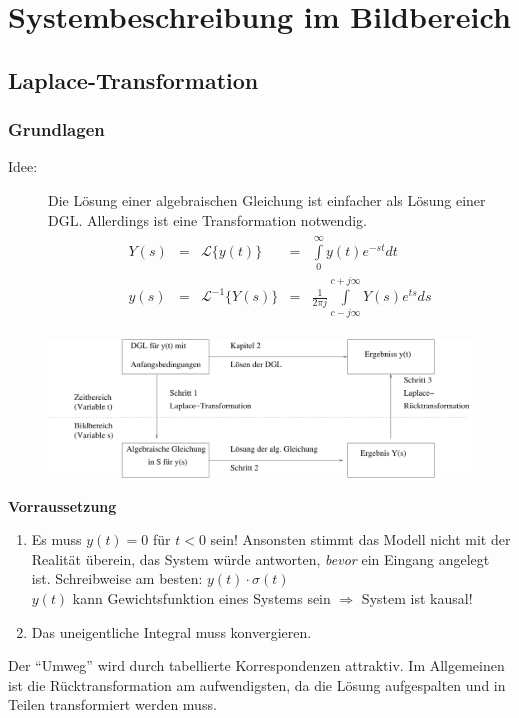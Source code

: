 \message{ !name(Mitschrieb_SysRegel.tex)}\documentclass[12pt,a4paper,ngerman]{scrartcl}
\begin{document}
\section{Systembeschreibung im Bildbereich}

\subsection{Laplace-Transformation}

\subsubsection{Grundlagen}

\begin{description}
\item[Idee:] Die Lösung einer algebraischen Gleichung ist einfacher als Lösung einer DGL. Allerdings ist eine Transformation notwendig.
  \begin{align*}
    \begin{array}{lllll}
    Y(s)&=&\mathcal{L}\{y(t)\} &=& \int\limits_0^\infty{y(t)e^{-st}dt}\\
    y(s)&=&\mathcal{L}^{-1}\{Y(s)\} &=&\frac{1}{2\pi j} \int\limits_{c-j\infty}^{c+j\infty}{Y(s)e^{ts}ds}
    \end{array}
  \end{align*}
\end{description}
\begin{figure}[H]
  \centering
  \includegraphics[width=\linewidth]{sysregel_laplace}
\end{figure}
\textbf{Vorraussetzung}
  \begin{enumerate}
  \item Es muss $y(t)=0$ für $t<0$ sein! Ansonsten stimmt das Modell nicht mit der Realität überein, das System würde antworten, \emph{bevor} ein Eingang angelegt ist. Schreibweise am besten: $y(t)\cdot \sigma (t)$\\
$y(t)$ kann Gewichtsfunktion eines Systems sein $\Rightarrow$ System ist kausal!

\item Das uneigentliche Integral muss konvergieren.
  \end{enumerate}
Der ``Umweg'' wird durch tabellierte Korrespondenzen attraktiv. Im Allgemeinen ist die Rücktransformation am aufwendigsten, da die Lösung aufgespalten und in Teilen transformiert werden muss.
\end{document}

